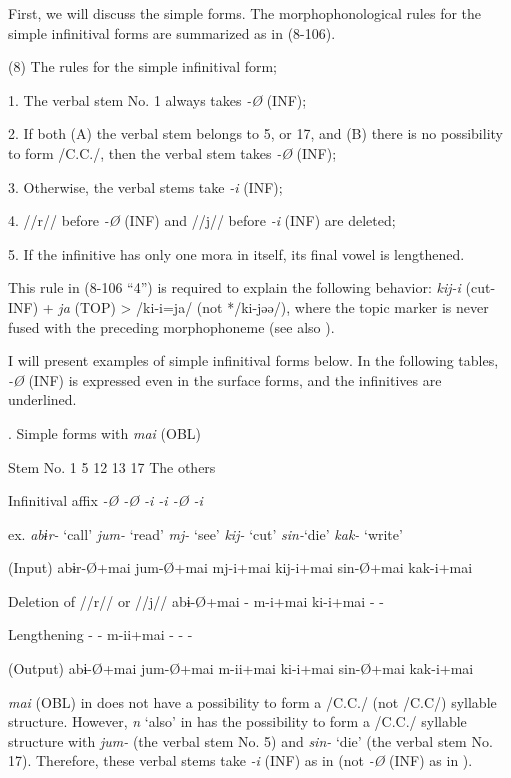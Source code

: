   First, we will discuss the simple forms. The morphophonological rules for the simple infinitival forms are summarized as in (8-106).

(8)  The rules for the simple infinitival form;

  1.  The verbal stem No. 1 always takes \textit{{}-Ø} (INF);

  2.  If both (A) the verbal stem belongs to 5, or 17, and (B) there is no possibility to form /C.C./, then the verbal stem takes \textit{{}-Ø} (INF);

  3.  Otherwise, the verbal stems take \textit{-i} (INF);

  4.  //r// before \textit{{}-Ø} (INF) and //j// before \textit{{}-i} (INF) are deleted;

  5.  If the infinitive has only one mora in itself, its final vowel is lengthened.

This rule in (8-106 “4”) is required to explain the following behavior: \textit{kij-i} (cut-INF) + \textit{ja} (TOP) > /ki-i=ja/ (not */ki-jəə/), where the topic marker is never fused with the preceding morphophoneme (see also ).

I will present examples of simple infinitival forms below. In the following tables, \textit{{}-Ø} (INF) is expressed even in the surface forms, and the infinitives are underlined.

\begin{styleBeschriftung}
\textmd{}\textmd{. Simple forms with}\textmd{ \textit{mai}}\textmd{ (OBL)}
\end{styleBeschriftung}

Stem No.  1  5  12  13  17  The others

Infinitival affix  \textit{{}-Ø  {}-Ø  {}-i  {}-i  {}-Ø  {}-i}

ex.  \textit{abɨr-} ‘call’  \textit{jum-} ‘read’  \textit{mj-} ‘see’  \textit{kij-} ‘cut’  \textit{sin-}‘die’  \textit{kak-} ‘write’

(Input)  abɨr-Ø+mai  jum-Ø+mai  mj-i+mai  kij-i+mai  sin-Ø+mai  kak-i+mai

Deletion of //r// or //j//  abɨ-Ø+mai  {}-  m-i+mai  ki-i+mai  {}-  {}-

Lengthening  {}-  {}-  m-ii+mai  {}-  {}-  {}-

(Output)  abɨ-Ø+mai  jum-Ø+mai  m-ii+mai  ki-i+mai  sin-Ø+mai  kak-i+mai

\textit{mai} (OBL) in  does not have a possibility to form a /C.C./ (not /C.C/) syllable structure. However, \textit{n} ‘also’ in  has the possibility to form a /C.C./ syllable structure with \textit{jum-} (the verbal stem No. 5) and \textit{sin-} ‘die’ (the verbal stem No. 17). Therefore, these verbal stems take \textit{-i} (INF) as in  (not \textit{{}-Ø} (INF) as in ).

